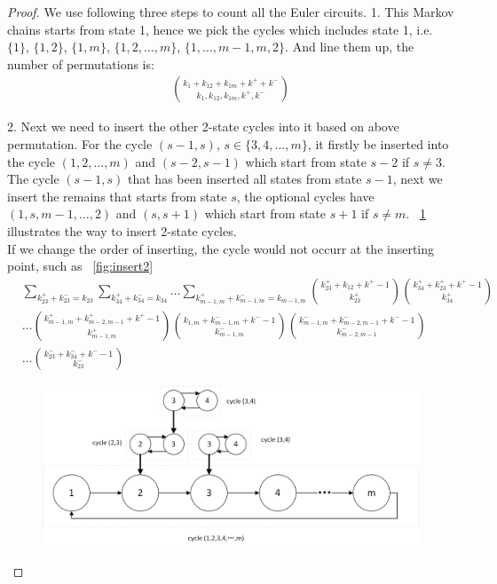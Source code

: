 \documentclass[11pt,en,cite=authoryear]{elegantpaper}
\begin{document}
\begin{proof}
    We use following three steps to count all the Euler circuits.
    1. This Markov chains starts from state 1, hence we pick the cycles which includes state 1, i.e. $\{1\}$, $\{1, 2\}$, $\{1, m\}$, $\{1, 2, \dots, m\}$, $\{1, \dots, m-1,m, 2\}$. And line them up, the number of permutations is:
    \begin{align*}
        \binom{k_{1}+k_{12}+k_{1m}+k^{+}+k^{-}}{k_{1}, k_{12}, k_{1m}, k^{+}, k^{-}}
    \end{align*}
    
    2. Next we need to insert the other 2-state cycles into it based on above permutation.
    For the cycle $(s-1, s)$, $s \in \{3, 4, \dots , m\}$, it firstly be inserted into the cycle $(1, 2, \dots, m)$ and $(s-2, s-1)$ which start from state $s-2$ if $s \neq 3$.
    The cycle $(s-1, s)$ that has been inserted all states from state $s-1$, next we insert the remains that starts from state $s$, the optional cycles have $(1, s, m-1, \dots, 2)$ and $(s, s+1)$ which start from state $s+1$ if $s \neq m$. ~\ref{fig:insert1} illustrates the way to insert 2-state cycles.\\
    If we change the order of inserting, the cycle would not occurr at the inserting point, such as ~\ref{fig:insert2}
    \begin{align*}
        &\sum_{k_{23}^{+}+k_{23}^{-}=k_{23}} \sum_{k_{34}^{+}+k_{34}^{-}=k_{34}}
        \dots \sum_{k_{m-1,m}^{+}+k_{m-1,m}^{-}=k_{m-1,m}}
        \binom{k_{23}^{+}+k_{12}+k^{+}-1}{k_{23}^{+}} \binom{k_{34}^{+}+k_{23}^{+}+k^{+}-1}{k_{34}^{+}} \\
        &\dots \binom{k_{m-1, m}^{+}+ k^{+}_{m-2, m-1} + k^{+}  -1}{k_{m-1, m}^{+}} \binom{k_{1, m} + k_{m-1, m}^{-} + k^{-} -1}{k_{m-1, m}^{-}} \binom{k_{m-1, m}^{-} + k_{m-2, m-1}^{-} + k^{-} - 1}{k_{m-2, m-1}^{-}} \\
        &\dots \binom{k_{23}^{-} + k_{34}^{-} + k^{-} - 1}{k_{23}^{-}}
    \end{align*}
    \begin{figure}[h] \label{fig:insert1} 
        \centering
        \includegraphics[scale=0.5]{insert1.png}

\end{figure}
\end{proof}
\end{document}
